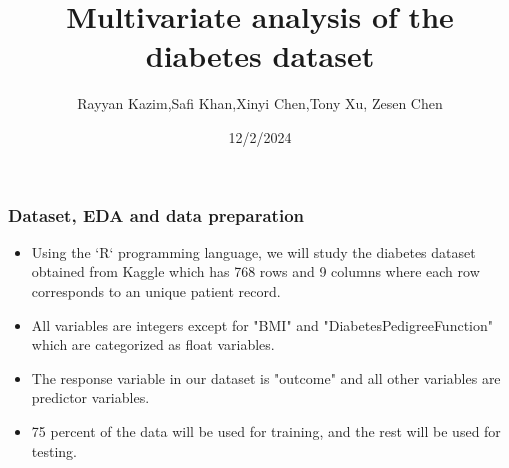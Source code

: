 \documentclass{beamer}
\title{Multivariate analysis of the diabetes dataset}
\author{Rayyan Kazim,Safi Khan,Xinyi Chen,Tony Xu, Zesen Chen}
\institute{McMaster University}
\date{12/2/2024}
\begin{document}
\frame{\titlepage}

\begin{frame}
\frametitle{Dataset, EDA and data preparation}
\begin{itemize}
    \setlength\itemsep{1em}
    \item Using the `R` programming language, we will study the diabetes dataset obtained from Kaggle which has 768 rows and 9 columns where each row corresponds to an unique patient record. 
    \item All variables are integers except for "BMI" and "DiabetesPedigreeFunction" which are categorized as float variables.
    \item The response variable in our dataset is "outcome" and all other variables are predictor variables.
    \item 75 percent of the data will be used for training, and the rest will be used for testing.
\end{itemize}
\end{frame}


\end{document}
